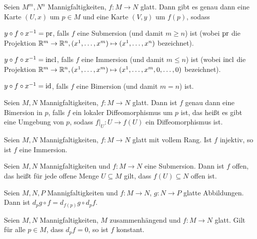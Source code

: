 \begin{korollar}[Normalformensatz]
  Seien $M^m,N^n$ Mannigfaltigkeiten, $f\colon M \to N$ glatt. Dann gibt
  es genau dann eine Karte $(U,x)$ um $p\in M$ und eine Karte $(V,y)$ um $f(p)$, sodass
  \begin{statements}
  \item $y\circ f\circ x^{-1} = \operatorname{pr}$, falls $f$ eine Submersion (und
    damit $m\geq n$) ist
    (wobei $\operatorname{pr}$ die Projektion $\mathbb{R}^m\to\mathbb{R}^n, (x^1,\dots,x^m) \mapsto
    (x^1,\dots,x^n)$ bezeichnet).
  \item $y\circ f\circ x^{-1} = \operatorname{incl}$, falls $f$ eine Immersion (und
    damit $m\leq n$) ist
    (wobei $\operatorname{incl}$ die Projektion $\mathbb{R}^m\to\mathbb{R}^n, (x^1,\dots,x^m) \mapsto
    (x^1,\dots,x^m,0,\dots,0)$ bezeichnet).
  \item $y\circ f\circ x^{-1} = \operatorname{id}$, falls $f$ eine Bimersion (und
    damit $m = n$) ist.
  \end{statements}
\end{korollar}

\begin{korollar}[Umkehrsatz]
  Seien $M,N$ Mannigfaltigkeiten, $f\colon M \to N$ glatt. Dann ist
  $f$ genau dann eine Bimersion in $p$, falls $f$ ein lokaler
  Diffeomorphismus um $p$ ist, das heißt es gibt eine Umgebung von
  $p$, sodass $f|_U\colon U \to f(U)$ ein Diffeomorphismus ist. 
\end{korollar}

\begin{proposition}
  Seien $M,N$ Mannigfaltigkeiten, $f\colon M \to N$ glatt mit vollem
  Rang. Ist $f$ injektiv, so ist $f$ eine Immersion.
\end{proposition}

\begin{proposition}
  Seien $M,N$ Mannigfaltigkeiten und $f\colon M \to N$ eine
  Submersion. Dann ist $f$ offen, das heißt für jede offene Menge
  $U\subseteq M$ gilt, dass $f(U) \subseteq N$ offen ist.
\end{proposition}

\begin{proposition}
  Seien $M,N,P$ Mannigfaltigkeiten und $f\colon M\to N$, $g\colon N
  \to P$ glatte Abbildungen. Dann ist $d_p g\circ f = d_{f(p)}g \circ d_pf$.
\end{proposition}

\begin{proposition}
  Seien $M,N$ Mannigfaltigkeiten, $M$ zusammenhängend und $f\colon M
  \to N$ glatt. Gilt für
  alle $p\in M$, dass $d_pf = 0$, so ist $f$ konstant. 
\end{proposition}

